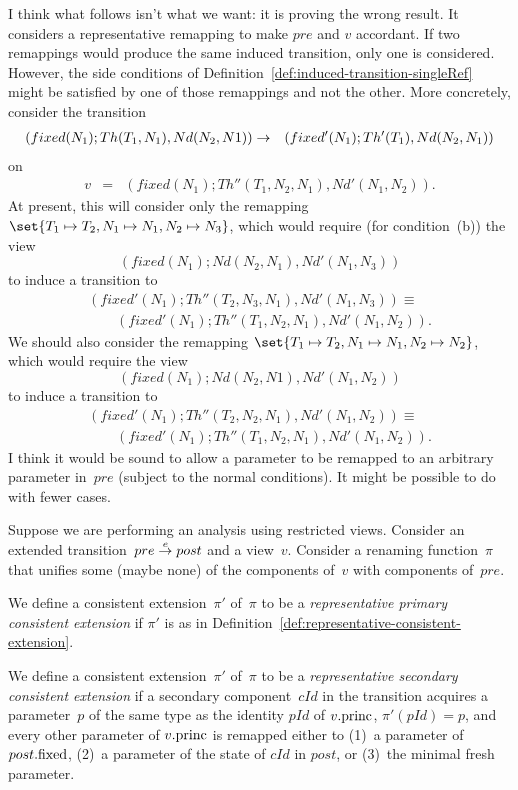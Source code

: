   I think what follows isn't what we want: it is
proving the wrong result.  It considers a representative remapping to make $pre$
and $v$ accordant.  If two remappings would  produce the same
induced transition, only one is considered.  However, the side conditions of
Definition~\ref{def:induced-transition-singleRef} might be satisfied by one of
those remappings and not the other.  More concretely, consider the transition
\begin{eqnarray*}
(fixed(N_1); Th(T_1,N_1), Nd(N_2,N1)) & \stackrel{}\rightarrow &
 (fixed'(N_1); Th'(T_1), Nd(N_2,N_1))
\end{eqnarray*}
on
\begin{eqnarray*}
v & = & (fixed(N_1); Th''(T_1,N_2,N_1), Nd'(N_1,N_2)).
\end{eqnarray*}
%
At present, this will consider only the remapping $\set{T_1 \mapsto T_2, N_1
  \mapsto N_1,\linebreak[1] {N_2 \mapsto N_3}}$, which would require (for
condition~(b)) the view
\[
(fixed(N_1); Nd(N_2,N_1), Nd'(N_1,N_3))
\]
to induce a transition to
\[
\begin{align}
(fixed'(N_1); Th''(T_2,N_3,N_1), Nd'(N_1,N_3)) \equiv \\
\qquad (fixed'(N_1); Th''(T_1,N_2,N_1), Nd'(N_1,N_2)).
\end{align}
\]
We should also consider the remapping $\set{T_1 \mapsto T_2, N_1 \mapsto N_1,
  N_2 \mapsto N_2}$, which would require the view
\[
(fixed(N_1); Nd(N_2,N1), Nd'(N_1,N_2))
\]
to induce a transition to
\[
\begin{align}
(fixed'(N_1); Th''(T_2,N_2,N_1), Nd'(N_1,N_2)) \equiv \\
\qquad (fixed'(N_1); Th''(T_1,N_2,N_1), Nd'(N_1,N_2)).
\end{align}
\]
I think it would be sound to allow a parameter to be remapped to an arbitrary
parameter in~$pre$ (subject to the normal conditions).  It might be possible
to do with fewer cases. 


\begin{definition} 
Suppose we are performing an analysis using restricted views.  Consider an
extended transition~$pre \stackrel{e}\rightarrow post$ and a view~$v$.  Consider a renaming
function~$\pi$ that unifies some (maybe none) of the components of~$v$ with
components of~$pre$.  

We define a consistent extension~$\pi'$ of~$\pi$ to be a
\emph{representative primary consistent extension} if  $\pi'$ is as in
  Definition~\ref{def:representative-consistent-extension}.

We define a consistent extension~$\pi'$ of~$\pi$ to be a \emph{representative
  secondary consistent extension} if a secondary component~$cId$ in the
transition acquires a parameter~$p$ of the same type as the identity $pId$ of
$v.\mathrm{princ}$, $\pi'(pId) = p$, and every other parameter of $v.\mathrm{princ}$ is
remapped either to (1)~a parameter of $post.\mathrm{fixed}$, (2)~a parameter of the
state of $cId$ in $post$, or (3)~the minimal fresh parameter.
\end{definition}


